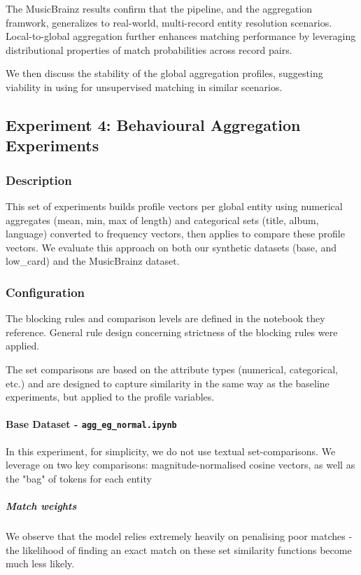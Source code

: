 The MusicBrainz results confirm that the \splink{} pipeline, and the aggregation framwork, generalizes to real-world, multi-record entity resolution scenarios. Local-to-global aggregation further enhances matching performance by leveraging distributional properties of match probabilities across record pairs.

We then discuss the stability of the global aggregation profiles, suggesting viability in using \splink{} for unsupervised matching in similar scenarios.

\subsection{Experiment 4: Behavioural Aggregation Experiments}
\label{sec:exp_aggregation}
\subsubsection{Description}
This set of experiments builds profile vectors per global entity using numerical aggregates (mean, min, max of length) and categorical sets (title, album, language) converted to frequency vectors, then applies \splink{} to compare these profile vectors. We evaluate this approach on both our synthetic datasets (base, and low\_card) and the MusicBrainz dataset.

\subsubsection{Configuration}
The blocking rules and comparison levels are defined in the notebook they reference. General rule design concerning strictness of the blocking rules were applied. 

The set comparisons are based on the attribute types (numerical, categorical, etc.) and are designed to capture similarity in the same way as the baseline experiments, but applied to the profile variables.

\paragraph{Base Dataset - \texttt{agg\_eg\_normal.ipynb}}
In this experiment, for simplicity, we do not use
textual set-comparisons. We leverage on two key comparisons: magnitude-normalised cosine vectors, as well as the "bag" of tokens for each entity
\subparagraph{Match weights}
We observe that the model relies extremely heavily on penalising poor matches - the likelihood of finding an exact match on these set similarity functions become much less likely.

